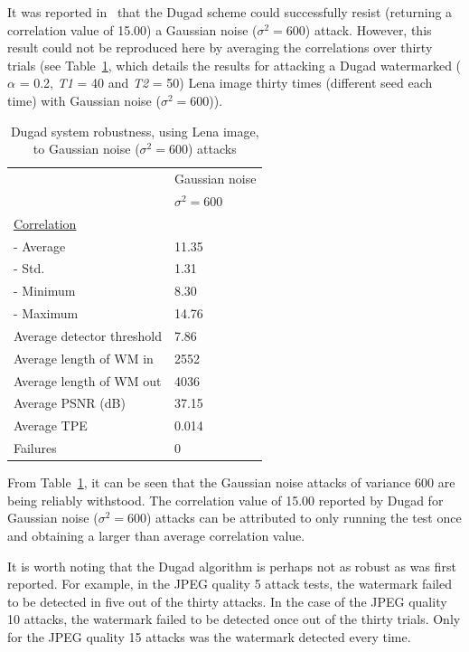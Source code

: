 \documentclass[12pt]{report}
\begin{document}
It was reported in~\cite{dugadDI} that the Dugad scheme
could successfully resist (returning a correlation value of 15.00) 
a Gaussian noise ($\sigma^{2}=600$) attack. However, this result could not
be reproduced here by averaging the correlations over thirty trials (see Table~\ref{tab:gaus600dug},
which details
the results for attacking a Dugad watermarked 
($\alpha$ = 0.2, \emph{T1} = 40 and \emph{T2} = 50) Lena image thirty times (different seed 
each time) with Gaussian noise ($\sigma^{2}=600$)).
\begin{table}[ht]
\setlength{\abovecaptionskip}{-0.2cm}
\begin{center}
\begin{tiny}
\begin{tabular}{|l|l|} \hline
			& Gaussian noise \\ 
			& $\sigma^{2}=600$ \\ \hline
\underline{Correlation} & \\ 
- Average	& 11.35 \\ 
- Std. 		& 1.31	\\ 
- Minimum	& 8.30	\\ 
- Maximum	& 14.76	\\ \hline
Average detector threshold & 7.86 \\ \hline
Average length of WM in	& 2552 \\ \hline
Average length of WM out& 4036 \\ \hline
Average PSNR (dB) & 37.15	\\ \hline
Average TPE & 0.014	\\ \hline
Failures 	& 0 \\ \hline
\end{tabular}
\end{tiny}
\end{center}
\caption{Dugad system robustness, using Lena image, to Gaussian noise ($\sigma^{2}=600$) attacks}
\label{tab:gaus600dug}
\setlength{\abovecaptionskip}{0cm}
\end{table}
From Table~\ref{tab:gaus600dug}, it can be seen that the Gaussian noise attacks of variance 600 are being
reliably withstood. The correlation value of 15.00 reported by Dugad for Gaussian noise ($\sigma^{2}=600$) attacks
can be attributed to only running the test once and obtaining a larger than average correlation value.

It is worth noting that the Dugad algorithm is perhaps not as robust as
was first reported. For example, in the JPEG quality 5 attack tests,
the watermark failed to be detected in five out of the thirty attacks.
In the case
of the JPEG quality 10 attacks, the watermark failed to be detected once
out of the thirty trials. Only for the JPEG quality 15 attacks was the watermark
detected every time. 
\end{document}
